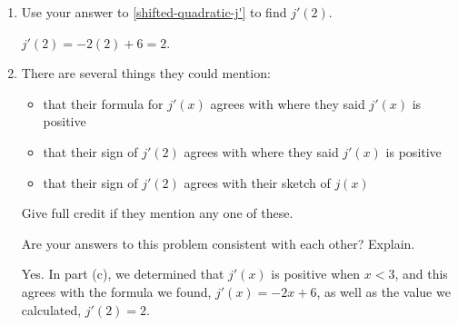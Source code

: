 \documentclass{article}
\providecommand{\check}{}
\renewcommand{\check}{\ifmmode{\text{ \ding{51} }}\else{\ding{51} }\fi}
\begin{document}
\begin{enumerate}
\begin{enumerate}
  \item \label{shifted-quadratic-j'(2)}

    \begin{problem}[\stretch{0.25}]
      Use your answer to \ref{shifted-quadratic-j'} to find $j'(2)$. 
    \end{problem}

    \begin{solution}
      $j'(2) = -2(2)+6 = 2$. 
    \end{solution}

  \item

    \begin{grading}
      There are several things they could mention:
      \begin{itemize}[nosep]
      \item that their formula for $j'(x)$ agrees with where they said $j'(x)$ is positive
      \item that their sign of $j'(2)$ agrees with where they said $j'(x)$ is positive
      \item that their sign of $j'(2)$ agrees with their sketch of $j(x)$
      \end{itemize}
      Give full credit if they mention any one of these.
    \end{grading}

    \begin{problem}[\stretch{0.5}]
      \check Are your answers to this problem consistent with each other? Explain.
    \end{problem}

    \begin{solution}
      Yes. In part (c), we determined that $j'(x)$ is positive when $x<3$, and this agrees with the formula
      we found, $j'(x) = -2x+6$, as well as the value we calculated, $j'(2) = 2$. 
    \end{solution}

  \end{enumerate}


\end{enumerate}
\end{document}
